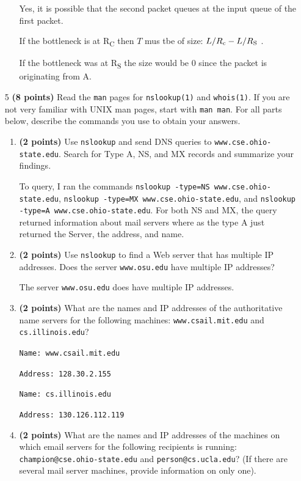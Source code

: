 \documentclass{article}
\begin{document}
\begin{enumerate}
\begin{enumerate}
	Yes, it is possible that the second packet queues at the input queue of the first packet. 

	\vspace{60 mm}
	
	If the bottleneck is at R\textsubscript{C} then $T$ mus tbe of size: $L/R\textsubscript{c} - L/R\textsubscript{S}$ .

	If the bottleneck was at R\textsubscript{S} the size would be 0 since the packet is originating from A.

\end{enumerate}

\item[5]\textbf{(8 points)} Read the \texttt{man} pages for \texttt{nslookup(1)} and \texttt{whois(1)}. If you are not very familiar with UNIX man pages, start with \texttt{man man}. For all parts below, describe the commands you use to obtain your answers.

\begin{enumerate}
\item \textbf{(2 points)} Use \texttt{nslookup} and send DNS queries to \texttt{www.cse.ohio-state.edu}. Search for Type A, NS, and MX records and summarize your findings.

To query, I ran the commands \texttt{nslookup -type=NS www.cse.ohio-state.edu}, \texttt{nslookup -type=MX www.cse.ohio-state.edu}, and \texttt{nslookup -type=A www.cse.ohio-state.edu}. For both NS and MX, the query returned information about mail servers where as the type A just returned the Server, the address, and name.

\item \textbf{(2 points)} Use \texttt{nslookup} to find a Web server that has multiple IP addresses. Does the server \texttt{www.osu.edu} have multiple IP addresses?

The server \texttt{www.osu.edu} does have multiple IP addresses.

\item \textbf{(2 points)} What are the names and IP addresses of the authoritative name servers for the following machines: \texttt{www.csail.mit.edu} and \texttt{cs.illinois.edu}?

\texttt{Name: www.csail.mit.edu}

\texttt{Address: 128.30.2.155}

\texttt{Name: cs.illinois.edu}

\texttt{Address: 130.126.112.119}

\item \textbf{(2 points)} What are the names and IP addresses of the machines on which email servers for the following recipients is running: \texttt{champion@cse.ohio-state.edu} and \texttt{person@cs.ucla.edu}? (If there are several mail server machines, provide information on only one).


\end{enumerate}
\end{enumerate}
\end{document}
